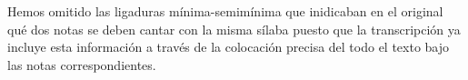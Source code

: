 Hemos omitido las ligaduras mínima-semimínima que inidicaban en el original qué dos notas se deben cantar con la misma sílaba puesto que la transcripción ya incluye esta información a través de la colocación precisa del todo el texto bajo las notas correspondientes. 
